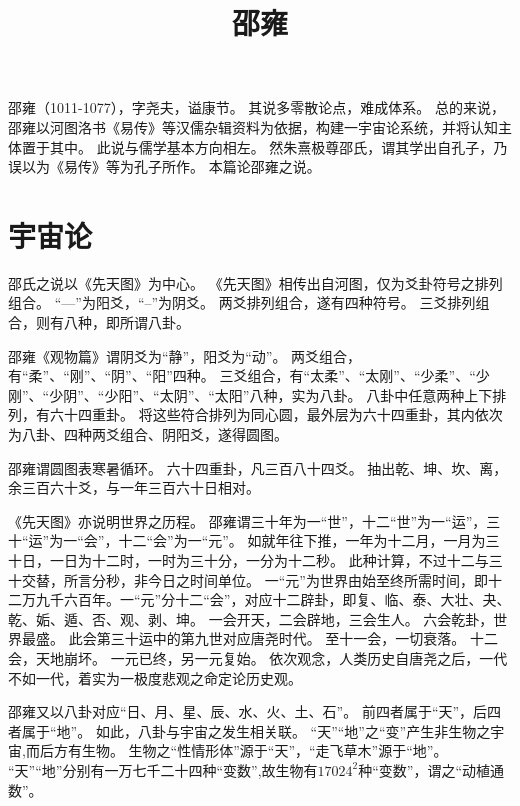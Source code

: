 \documentclass[11pt]{article}
\title{邵雍}
\date{}
\begin{document}
  \maketitle

  \linenumbers
邵雍（1011-1077），字尧夫，谥康节。
其说多零散论点，难成体系。
总的来说，邵雍以河图洛书《易传》等汉儒杂辑资料为依据，构建一宇宙论系统，并将认知主体置于其中。
此说与儒学基本方向相左。
然朱熹极尊邵氏，谓其学出自孔子，乃误以为《易传》等为孔子所作。
本篇论邵雍之说。

\section{宇宙论}
邵氏之说以《先天图》为中心。
《先天图》相传出自河图，仅为爻卦符号之排列组合。
“—”为阳爻，“--”为阴爻。
两爻排列组合，遂有四种符号。
三爻排列组合，则有八种，即所谓八卦。

\newline

邵雍《观物篇》谓阴爻为“静”，阳爻为“动”。
两爻组合，有“柔”、“刚”、“阴”、“阳”四种。
三爻组合，有“太柔”、“太刚”、“少柔”、“少刚”、“少阴”、“少阳”、“太阴”、“太阳”八种，实为八卦。
八卦中任意两种上下排列，有六十四重卦。
将这些符合排列为同心圆，最外层为六十四重卦，其内依次为八卦、四种两爻组合、阴阳爻，遂得圆图。

\newline

邵雍谓圆图表寒暑循环。
六十四重卦，凡三百八十四爻。
抽出乾、坤、坎、离，余三百六十爻，与一年三百六十日相对。

\newline

《先天图》亦说明世界之历程。
邵雍谓三十年为一“世”，十二“世”为一“运”，三十“运”为一“会”，十二“会”为一“元”。
如就年往下推，一年为十二月，一月为三十日，一日为十二时，一时为三十分，一分为十二秒。
此种计算，不过十二与三十交替，所言分秒，非今日之时间单位。
一“元”为世界由始至终所需时间，即十二万九千六百年。一“元”分十二“会”，对应十二辟卦，即复、临、泰、大壮、夬、乾、姤、遁、否、观、剥、坤。
一会开天，二会辟地，三会生人。
六会乾卦，世界最盛。
此会第三十运中的第九世对应唐尧时代。
至十一会，一切衰落。
十二会，天地崩坏。
一元已终，另一元复始。
依次观念，人类历史自唐尧之后，一代不如一代，着实为一极度悲观之命定论历史观。

\newline

邵雍又以八卦对应“日、月、星、辰、水、火、土、石”。
前四者属于“天”，后四者属于“地”。
如此，八卦与宇宙之发生相关联。
“天”“地”之“变”产生非生物之宇宙,而后方有生物。
生物之“性情形体”源于“天”，“走飞草木”源于“地”。
“天”“地”分别有一万七千二十四种“变数”,故生物有$17024^2$种“变数”，谓之“动植通数”。
\end{document}
